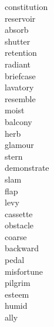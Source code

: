\documentclass[a4paper, 11pt]{ctexart}
\begin{document}
\begin{multicols*}{3}
\begin{description}
\item[constitution]

\item[reservoir]

\item[absorb]

\item[shutter]

\item[retention]

\item[radiant]

\item[briefcase]

\item[lavatory]

\item[resemble]

\item[moist]

\item[balcony]

\item[herb]

\item[glamour]

\item[stern]

\item[demonstrate]

\item[slam]

\item[flap]

\item[levy]

\item[cassette]

\item[obstacle]

\item[coarse]

\item[backward]

\item[pedal]

\item[misfortune]

\item[pilgrim]

\item[esteem]

\item[humid]

\item[ally]


\end{description}
\end{multicols*}
\end{document}
